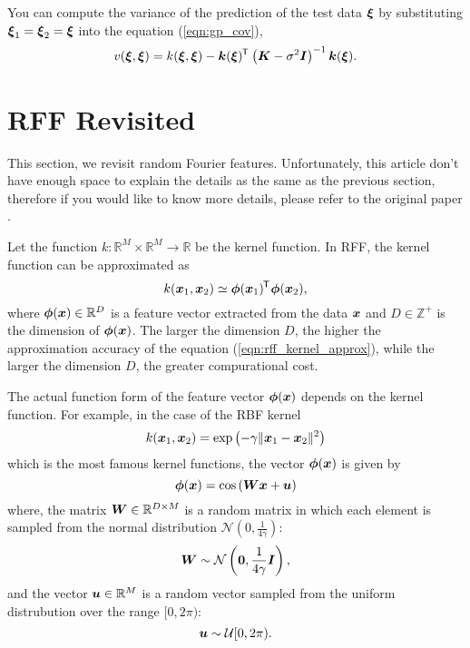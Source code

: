 \documentclass[twocolumn,a4paper,10pt]{article}
\begin{document}
You can compute the variance of the prediction of the test data $\boldsymbol{\xi}$
by substituting $\boldsymbol{\xi}_1 = \boldsymbol{\xi}_2 = \boldsymbol{\xi}$ into the equation (\ref{eqn:gp_cov}),
\begin{equation}
    v (\boldsymbol{\xi}, \boldsymbol{\xi}) = k (\boldsymbol{\xi}, \boldsymbol{\xi})
    - \boldsymbol{k} (\boldsymbol{\xi})^{\mkern-1.5mu\mathsf{T}}\hspace{0.5pt} \left( \boldsymbol{K} - \sigma^2 \boldsymbol{I} \right)^{-1} \boldsymbol{k} (\boldsymbol{\xi}).
\end{equation}


\section{RFF Revisited}\titlebar

This section, we revisit random Fourier features. Unfortunately, this article don't have
enough space to explain the details as the same as the previous section, therefore if you
would like to know more details, please refer to the original paper \cite{Rahimi2007}.

Let the function $k: \mathbb{R}^M \times \mathbb{R}^M \to \mathbb{R}$ be the kernel function.
In RFF, the kernel function can be approximated as
\begin{equation}
    k (\boldsymbol{x}_1, \boldsymbol{x}_2) \simeq \boldsymbol{\phi}(\boldsymbol{x}_1)^{\mkern-1.5mu\mathsf{T}}\hspace{0.5pt} \boldsymbol{\phi}(\boldsymbol{x}_2),
    \label{eqn:rff_kernel_approx}
\end{equation}
where $\boldsymbol{\phi}(\boldsymbol{x}) \in \mathbb{R}^D$ is a feature vector extracted from 
the data $\boldsymbol{x}$ and $D \in \mathbb{Z}^+$ is the dimension of $\boldsymbol{\phi}(\boldsymbol{x})$.
The larger the dimension $D$, the higher the approximation accuracy of the equation
(\ref{eqn:rff_kernel_approx}), while the larger the dimension $D$, the greater compurational cost.

The actual function form of the feature vector $\boldsymbol{\phi}(\boldsymbol{x})$ depends on the kernel function.
For example, in the case of the RBF kernel
\begin{equation}
    k (\boldsymbol{x}_1, \boldsymbol{x}_2) = \exp \left (- \gamma \| \boldsymbol{x}_1 - \boldsymbol{x}_2 \|^2 \right)
\end{equation}
which is the most famous kernel functions, the vector $\boldsymbol{\phi} (\boldsymbol{x})$ is given by
\begin{equation}
    \boldsymbol{\phi} (\boldsymbol{x}) = \cos \left( \boldsymbol{Wx} + \boldsymbol{u} \right)
\end{equation}
where, the matrix $\boldsymbol{W} \in \mathbb{R}^{D \times M} $ is a random matrix in which each element
is sampled from the normal distribution $\mathcal{N} (0, \frac{1}{4 \gamma})$:
\begin{equation}
    \boldsymbol{W} \sim \mathcal{N} \left( \boldsymbol{0}, \frac{1}{4 \gamma} \boldsymbol{I} \right),
\end{equation}
and the vector $\boldsymbol{u} \in \mathbb{R}^M$ is a random vector sampled from the 
uniform distrubution over the range $[0, 2 \pi)$:
\begin{equation}
    \boldsymbol{u} \sim \mathcal{U} [0, 2 \pi).
\end{equation}
\end{document}
